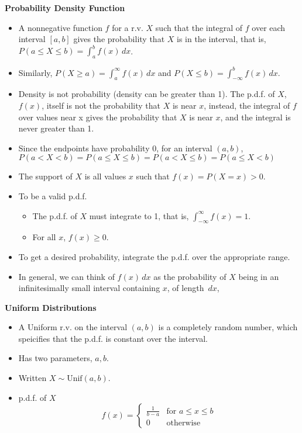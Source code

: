 \documentclass[11pt]{article}
\begin{document}
\textbf{Probability Density Function}
\begin{itemize}
    \item A nonnegative function $f$ for a r.v. $X$ such that the integral of $f$ over each 
    interval $[a,b]$ gives the probability that $X$ is in the interval, that is, $P(a \le X 
    \le b) = \int_{a}^{b} f(x) \,dx$.
    \item Similarly, $P(X \ge a) = \int_{a}^{\infty} f(x) \,dx$ and $P(X \le b) = \int_
    {-\infty}^{b} f(x) \,dx$.
    \item Density is not probability (density can be greater than 1). The p.d.f. of $X$, 
    $f(x)$, itself is not the probability that $X$ is near $x$, instead, the integral of $f$ 
    over values near x gives the probability that $X$ is near $x$, and the integral is never 
    greater than 1.
    \item Since the endpoints have probability 0, for an interval $(a,b)$, $P(a < X < b) = 
    P(a \le X \le b) = P(a < X \le b) =  P(a \le X < b)$
    \item The support of $X$ is all values $x$ such that $f(x)=P(X=x)>0$.
    \item To be a valid p.d.f.
    \begin{itemize}
        \item The p.d.f. of $X$ must integrate to 1, that is, $\int_{-\infty}^{\infty} f(x)=1$.
        \item For all $x$, $f(x) \ge 0$.
    \end{itemize}
    \item To get a desired probability, integrate the p.d.f. over the appropriate range.
    \item In general, we can think of $f(x) \,dx$ as the probability of $X$ being in an 
    infinitesimally small interval containing $x$, of length $\,dx$,
\end{itemize}

\textbf{Uniform Distributions}
\begin{itemize}
    \item A Uniform r.v. on the interval $(a,b)$ is a completely random number, which speicifies 
    that the p.d.f. is constant over the interval.
    \item Has two parameters, $a,b$.
    \item Written $X \sim \text{Unif}(a,b)$.
    \item p.d.f. of $X$
    \[ f(x) = \begin{cases} 
        \frac{1}{b-a} & \text{for } a \le x \le b \\
        0 & \text{otherwise}
     \end{cases}
  \]
\end{itemize}
\end{document}

